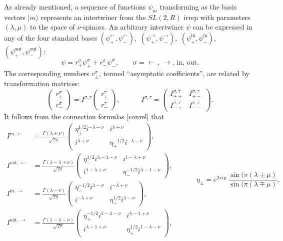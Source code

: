 \documentclass[11pt]{article}
\newcommand{\lt}{\left}
\newcommand{\rt}{\right}
\newcommand*{\ket}[1]{|{#1}\rangle}
\newcommand{\RR}{\mathbb{R}}
\DeclareMathOperator{\SL}{SL}
\newcommand{\lar}{{\leftarrow}}
\newcommand{\rar}{{\rightarrow}}
\newcommand{\IN}{\text{in}}
\newcommand{\OUT}{\text{out}}
\def\widetilde#1{#1}%
\def\SL{SL}
\def\RR{R}
\begin{document}
As already mentioned, a sequence of functions $\psi_m$ transforming as the basis vectors $\ket{m}$ represents an intertwiner from the $\widetilde{\SL}(2,\RR)$ irrep with parameters $(\lambda,\mu)$ to the space of $\nu$-spinors. An arbitrary intertwiner $\psi$ can be expressed in any of the four standard bases $\lt( \psi^{\lar}_{+},\psi^{\lar}_{-} \rt)$,\, $\lt(\psi^{\rar}_{+},\psi^{\rar}_{-} \rt)$,\, $\lt( \psi^{\IN}_{+},\psi^{\IN}_{-} \rt)$,\, $\lt( \psi^{\OUT}_{+},\psi^{\OUT}_{-} \rt)$:
\begin{equation}
\psi=r^{\sigma}_{+}\psi^{\sigma}_{+}+r^{\sigma}_{-}\psi^{\sigma}_{-},\qquad
\sigma=\lar,\,\rar,\,\IN,\,\OUT.
\end{equation}
The corresponding numbers $r^{\sigma}_{\pm}$, termed ``asymptotic coefficients'', are related by transformation matrices:
\begin{equation}
\begin{pmatrix}r^{\sigma}_{+}\\[2pt] r^{\sigma}_{-}\end{pmatrix}
=I^{\sigma,\tau}
\begin{pmatrix}r^{\tau}_{+}\\[2pt] r^{\tau}_{-}\end{pmatrix},\qquad\quad
I^{\sigma,\tau}=\begin{pmatrix}
I^{\sigma,\tau}_{++} & I^{\sigma,\tau}_{+-}\\[2pt]
I^{\sigma,\tau}_{-+} & I^{\sigma,\tau}_{--}
\end{pmatrix}.
\end{equation}
It follows from the connection formulas \eqref{conrel} that
\begin{equation}
\begin{aligned}
I^{\IN,\lar}&= \frac{\Gamma(\lambda+\nu)}{\sqrt{2\pi}}
\begin{pmatrix}
\eta_{+}^{1/2}i^{-\lambda-\nu} & i^{\lambda+\nu}\\[2pt]
i^{\lambda+\nu} & \eta_{+}^{-1/2}i^{-\lambda-\nu} 
\end{pmatrix},
\\[8pt]
I^{\OUT,\lar}&= \frac{\Gamma(1-\lambda+\nu)}{\sqrt{2\pi}}
\begin{pmatrix}
\eta_{-}^{1/2}i^{\lambda-1-\nu} & i^{1-\lambda+\nu}\\[2pt]
i^{1-\lambda+\nu} & \eta_{-}^{-1/2}i^{\lambda-1-\nu}
\end{pmatrix},
\\[8pt]
I^{\IN,\rar}&= \frac{\Gamma(\lambda-\nu)}{\sqrt{2\pi}}
\begin{pmatrix}
\eta_{-}^{-1/2}i^{\lambda-\nu} & i^{-\lambda+\nu}\\[2pt]
i^{-\lambda+\nu} & \eta_{-}^{1/2}i^{\lambda-\nu} 
\end{pmatrix},
\\[8pt]
I^{\OUT,\rar}&= \frac{\Gamma(1-\lambda-\nu)}{\sqrt{2\pi}}
\begin{pmatrix}
\eta_{+}^{-1/2}i^{1-\lambda-\nu} & i^{\lambda-1+\nu}\\[2pt]
i^{\lambda-1+\nu} & \eta_{+}^{1/2}i^{1-\lambda-\nu}
\end{pmatrix},
\end{aligned}\qquad\quad
\eta_{\pm}=e^{2\pi i\mu}\,
\frac{\sin(\pi(\lambda\pm\mu)}{\sin(\pi(\lambda\mp\mu)},
\end{equation}
\end{document}
